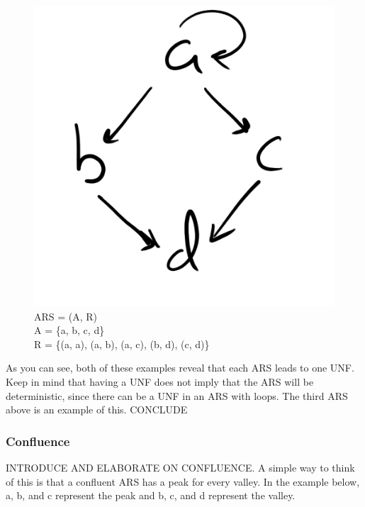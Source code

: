 \documentclass{article}
\begin{document}
{\begin{figure}[h!]
  \centering
  \includegraphics[scale=0.06]{gen13}
  \caption[] {
     ARS = (A, R) \\ A = \{a, b, c, d\} \\ R = \{(a, a), (a, b), (a, c), (b, d), (c, d)\}
    \endtabular}
\end{figure}

\medskip\noindent
As you can see, both of these examples reveal that each ARS leads to one UNF. Keep in mind that having a UNF does not imply that the ARS will be deterministic, since there can be a UNF in an ARS with loops. The third ARS above is an example of this. CONCLUDE


\subsubsection{Confluence}

\medskip\noindent
INTRODUCE AND ELABORATE ON CONFLUENCE. A simple way to think of this is that a confluent ARS has a peak for every valley. In the example below, a, b, and c represent the peak and b, c, and d represent the valley.

}
\end{document}

